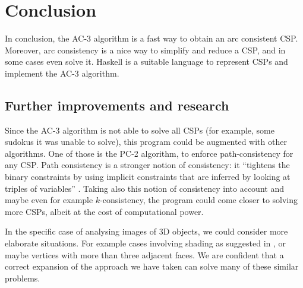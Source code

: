 \section{Conclusion}\label{sec:conclusion}

In conclusion, the AC-3 algorithm is a fast way to obtain an arc consistent CSP. Moreover, arc consistency is a nice way to simplify and reduce a CSP, and in some cases even solve it.
Haskell is a suitable language to represent CSPs and implement the AC-3 algorithm.

\subsection{Further improvements and research}\label{sec:further}

Since the AC-3 algorithm is not able to solve all CSPs (for example, some sudokus it was unable to solve), this program could be augmented with other algorithms.
One of those is the PC-2 algorithm, to enforce path-consistency for any CSP. Path consistency is a stronger notion of consistency: it ``tightens the binary constraints by using implicit constraints that are inferred by looking at triples of variables'' \cite[p.~210]{AIMA}.
Taking also this notion of consistency into account and maybe even for example $k$-consistency, the program could come closer to solving more CSPs, albeit at the cost of computational power.

In the specific case of analysing images of 3D objects, we could consider more elaborate situations. For example cases involving shading as suggested in \cite{winston1992}, or maybe vertices with more than three adjacent faces.
We are confident that a correct expansion of the approach we have taken can solve many of these similar problems.